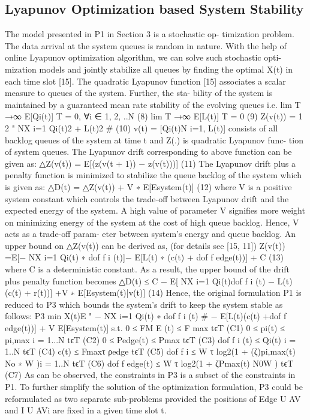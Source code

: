 \documentclass{article}
\begin{document}
\begin{multicols}{2}
\section{Lyapunov Optimization based System Stability}
The model presented in P1 in Section 3 is a stochastic op-
timization problem. The data arrival at the system queues
is random in nature. With the help of online Lyapunov
optimization algorithm, we can solve such stochastic opti-
mization models and jointly stabilize all queues by finding
the optimal X(t) in each time slot [15].
The quadratic Lyapunov function [15] associates a
scalar measure to queues of the system. Further, the sta-
bility of the system is maintained by a guaranteed mean
rate stability of the evolving queues i.e.
lim
T →∞
E[Qi(t)]
T = 0, ∀i ∈ 1, 2, ..N (8)
lim
T →∞
E[L(t)]
T = 0 (9)
Z(v(t)) = 1
2
" NX
i=1
Qi(t)2 + L(t)2
#
(10)
v(t) = [{Qi(t)}N
i=1, L(t)] consists of all backlog queues of
the system at time t and Z(.) is quadratic Lyapunov func-
tion of system queues.
The Lyapunov drift corresponding to above function
can be given as:
△Z(v(t)) = E[(z(v(t + 1)) − z(v(t)))] (11)
The Lyapunov drift plus a penalty function is minimized
to stabilize the queue backlog of the system which is given
as:
△D(t) = △Z(v(t)) + V ∗ E[Esystem(t)] (12)
where V is a positive system constant which controls the
trade-off between Lyapunov drift and the expected energy
of the system. A high value of parameter V signifies more
weight on minimizing energy of the system at the cost of
high queue backlog. Hence, V acts as a trade-off param-
eter between system’s energy and queue backlog.
An upper bound on △Z(v(t)) can be derived as, (for
details see [15, 11])
Z(v(t)) =E[−
NX
i=1
Qi(t) ∗ dof f
i (t)]−
E[L(t) ∗ (c(t) + dof f
edge(t))] + C
(13)
where C is a deterministic constant.
As a result, the upper bound of the drift plus penalty
function becomes
△D(t) ≤ C − E[
NX
i=1
Qi(t)dof f
i (t) − L(t)(c(t) + r(t))]
+V ∗ E[Esystem(t)|v(t)]
(14)
Hence, the original formulation P1 is reduced to P3 which
bounds the system’s drift to keep the system stable as
follows:
P3 min
X(t)E
"
−
NX
i=1
Qi(t) ∗ dof f
i (t)
#
− E[L(t)(c(t)
+dof f
edge(t))] + V E[Esystem(t)]
s.t.
0 ≤ FM E (t) ≤ F max tϵT (C1)
0 ≤ pi(t) ≤ pi,max i = 1...N tϵT (C2)
0 ≤ Pedge(t) ≤ Pmax tϵT (C3)
dof f
i (t) ≤ Qi(t) i = 1..N tϵT (C4)
c(t) ≤ Fmaxτ
ρedge
tϵT (C5)
dof f
i ≤ W τ log2(1 + (ζ)pi,max(t)
No ∗ W )i = 1..N tϵT (C6)
dof f
edge(t) ≤ W τ log2(1 + ζPmax(t)
N0W ) tϵT (C7)
As can be observed, the constraints in P3 is a subset of
the constraints in P1. To further simplify the solution of
the optimization formulation, P3 could be reformulated
as two separate sub-problems provided the positions of
Edge U AV and I U AVi are fixed in a given time slot t.

\end{multicols}
\end{document}
